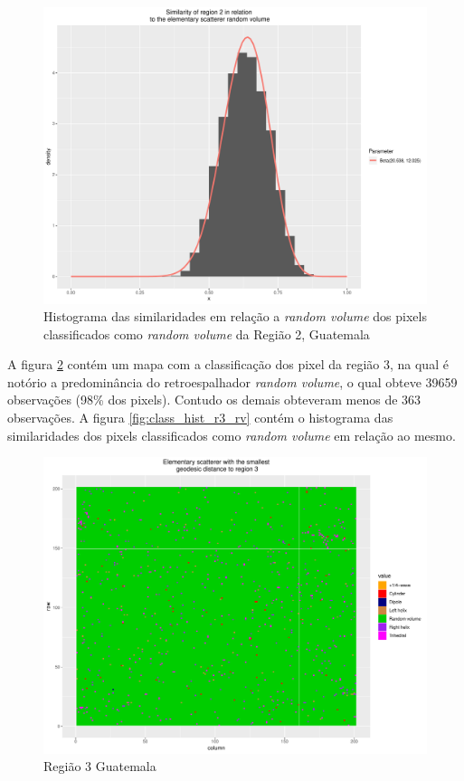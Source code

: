 \documentclass[12pt]{article}
\begin{document}
\begin{figure}[!h]
    \centering   
    \includegraphics[width = 0.85\linewidth]{../../Images/Report_18_12_20/Classifier_Geo_Dist/Histograms/Guate/region2_rv_sm_filter.pdf}
    \caption{Histograma das similaridades em relação a \textit{random volume} dos pixels classificados como \textit{random volume} da Região 2, Guatemala}
    \label{fig:class_hist_r2_rv}
\end{figure}

A figura \ref{fig:class_map_r3} contém um mapa com a classificação dos pixel da região 3, na qual é notório a predominância do retroespalhador \textit{random volume}, o qual obteve 39659 observações (98\% dos pixels). Contudo os demais obteveram menos de 363 observações. A figura \ref{fig:class_hist_r3_rv} contém o histograma das similaridades dos pixels classificados como \textit{random volume} em relação ao mesmo.

\begin{figure}[!h]
    \centering    
    \includegraphics[width = 0.8\linewidth]{../../Images/Report_18_12_20/Classifier_Geo_Dist/Class_Map/Guate/region3_predomain.pdf}
    \caption{Região 3 Guatemala}
    \label{fig:class_map_r3}
\end{figure}
\end{document}
